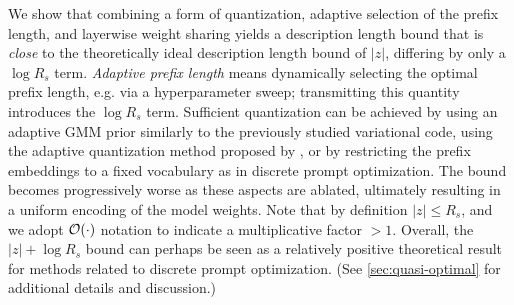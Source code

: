  \begin{table}[h!]
\centering
\caption{Combining standard methods for quantization, adaptive selection of the prefix length, and layerwise weight sharing yields a two-part code with a description length upper bound (described in \ref{sec:asymptotic-bounds}) close to the theoretical ideal of $|z|$.  Ablating these methods degrades the bound, shifting the encoding cost away from the algorithmic complexity of the function computed by the network ($|z|$) and causing the encoding cost to scale linearly with the total parameter count of the network, driven by its maximum space ($R_s$) and time ($R_t$) resources.}
\vspace{0.15cm}
\label{tab:asymptotic-bounds}
\end{table}

We show that combining a form of quantization, adaptive selection of the prefix length, and layerwise weight sharing yields a description length bound that is \emph{close} to the theoretically ideal description length bound of $|z|$, differing by only a $\log R_s$ term. \emph{Adaptive prefix length} means dynamically selecting the optimal prefix length, e.g. via a hyperparameter sweep; transmitting this quantity introduces the $\log R_s$ term. Sufficient quantization can be achieved by using an adaptive GMM prior similarly to the previously studied variational code, using the adaptive quantization method proposed by \citet{han2016deep}, or by restricting the prefix embeddings to a fixed vocabulary as in discrete prompt optimization. The bound becomes progressively worse as these aspects are ablated, ultimately resulting in a uniform encoding of the model weights. Note that by definition $|z| \leq R_s$, and we adopt ${\mathcal{O}}(\cdot)$ notation to indicate a multiplicative factor $>1$. Overall, the $|z| + \log R_s$ bound can perhaps be seen as a relatively positive theoretical result for methods related to discrete prompt optimization. (See \ref{sec:quasi-optimal} for additional details and discussion.)



